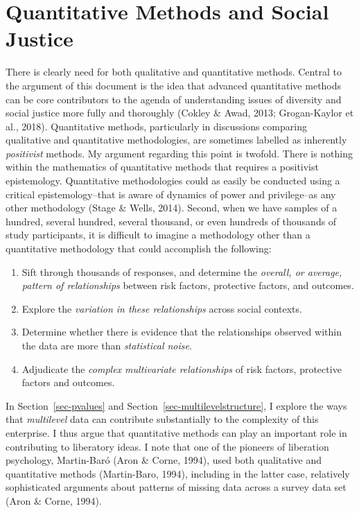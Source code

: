 \documentclass[
  letterpaper,
  DIV=11,
  numbers=noendperiod]{scrreprt}
\providecommand{\tightlist}{%
  \setlength{\itemsep}{0pt}\setlength{\parskip}{0pt}}\usepackage{longtable,booktabs,array}
\begin{document}
\hypertarget{quantitative-methods-and-social-justice}{%
\section{Quantitative Methods and Social
Justice}\label{quantitative-methods-and-social-justice}}

There is clearly need for both qualitative and quantitative methods.
Central to the argument of this document is the idea that advanced
quantitative methods can be core contributors to the agenda of
understanding issues of diversity and social justice more fully and
thoroughly (Cokley \& Awad, 2013; Grogan-Kaylor et al., 2018).
Quantitative methods, particularly in discussions comparing qualitative
and quantitative methodologies, are sometimes labelled as inherently
\emph{positivist} methods. My argument regarding this point is twofold.
There is nothing within the mathematics of quantitative methods that
requires a positivist epistemology. Quantitative methodologies could as
easily be conducted using a critical epistemology--that is aware of
dynamics of power and privilege--as any other methodology (Stage \&
Wells, 2014). Second, when we have samples of a hundred, several
hundred, several thousand, or even hundreds of thousands of study
participants, it is difficult to imagine a methodology other than a
quantitative methodology that could accomplish the following:

\begin{enumerate}
\def\labelenumi{\arabic{enumi}.}
\tightlist
\item
  Sift through thousands of responses, and determine the \emph{overall,
  or average, pattern of relationships} between risk factors, protective
  factors, and outcomes.
\item
  Explore the \emph{variation in these relationships} across social
  contexts.
\item
  Determine whether there is evidence that the relationships observed
  within the data are more than \emph{statistical noise}.
\item
  Adjudicate the \emph{complex multivariate relationships} of risk
  factors, protective factors and outcomes.
\end{enumerate}

In Section~\ref{sec-pvalues} and Section~\ref{sec-multilevelstructure},
I explore the ways that \emph{multilevel} data can contribute
substantially to the complexity of this enterprise. I thus argue that
quantitative methods can play an important role in contributing to
liberatory ideas. I note that one of the pioneers of liberation
psychology, Martin-Baró (Aron \& Corne, 1994), used both qualitative and
quantitative methods (Martin-Baro, 1994), including in the latter case,
relatively sophisticated arguments about patterns of missing data across
a survey data set (Aron \& Corne, 1994).
\end{document}
